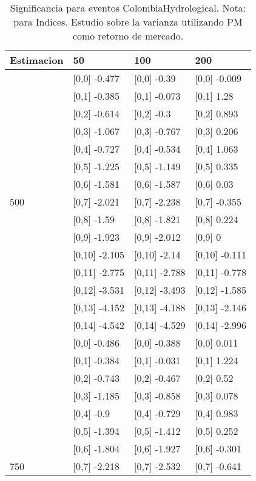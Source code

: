 \begin{table}

\caption{Significancia para eventos ColombiaHydrological. Nota: para Indices. Estudio sobre la varianza utilizando PM como retorno de mercado.}
\centering
\begin{tabular}[t]{llll}
\toprule
Estimacion & 50 & 100 & 200\\
\midrule
 & {}[0,0] -0.477 & {}[0,0] -0.39 & {}[0,0] -0.009\\
 & {}[0,1] -0.385 & {}[0,1] -0.073 & {}[0,1] 1.28\\
 & {}[0,2] -0.614 & {}[0,2] -0.3 & {}[0,2] 0.893\\
 & {}[0,3] -1.067 & {}[0,3] -0.767 & {}[0,3] 0.206\\
 & {}[0,4] -0.727 & {}[0,4] -0.534 & {}[0,4] 1.063\\
\addlinespace
 & {}[0,5] -1.225 & {}[0,5] -1.149 & {}[0,5] 0.335\\
 & {}[0,6] -1.581 & {}[0,6] -1.587 & {}[0,6] 0.03\\
500 & {}[0,7] -2.021 & {}[0,7] -2.238 & {}[0,7] -0.355\\
 & {}[0,8] -1.59 & {}[0,8] -1.821 & {}[0,8] 0.224\\
 & {}[0,9] -1.923 & {}[0,9] -2.012 & {}[0,9] 0\\
\addlinespace
 & {}[0,10] -2.105 & {}[0,10] -2.14 & {}[0,10] -0.111\\
 & {}[0,11] -2.775 & {}[0,11] -2.788 & {}[0,11] -0.778\\
 & {}[0,12] -3.531 & {}[0,12] -3.493 & {}[0,12] -1.585\\
 & {}[0,13] -4.152 & {}[0,13] -4.188 & {}[0,13] -2.146\\
 & {}[0,14] -4.542 & {}[0,14] -4.529 & {}[0,14] -2.996\\
\addlinespace
 & {}[0,0] -0.486 & {}[0,0] -0.388 & {}[0,0] 0.011\\
 & {}[0,1] -0.384 & {}[0,1] -0.031 & {}[0,1] 1.224\\
 & {}[0,2] -0.743 & {}[0,2] -0.467 & {}[0,2] 0.52\\
 & {}[0,3] -1.185 & {}[0,3] -0.858 & {}[0,3] 0.078\\
 & {}[0,4] -0.9 & {}[0,4] -0.729 & {}[0,4] 0.983\\
\addlinespace
 & {}[0,5] -1.394 & {}[0,5] -1.412 & {}[0,5] 0.252\\
 & {}[0,6] -1.804 & {}[0,6] -1.927 & {}[0,6] -0.301\\
750 & {}[0,7] -2.218 & {}[0,7] -2.532 & {}[0,7] -0.641\\

\end{tabular}
\end{table}
